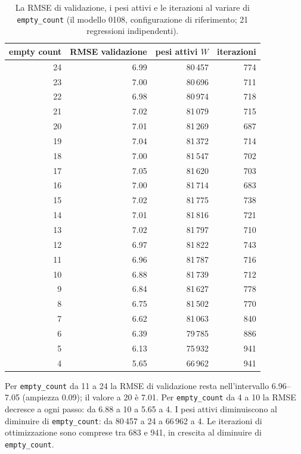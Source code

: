 \begin{table}[ht]
\centering
\begin{tabular}{rrrr}
\toprule
empty count & RMSE validazione & pesi attivi $W$ & iterazioni \\
\midrule
24 & 6.99 & 80\,457 & 774 \\
23 & 7.00 & 80\,696 & 711 \\
22 & 6.98 & 80\,974 & 718 \\
21 & 7.02 & 81\,079 & 715 \\
20 & 7.01 & 81\,269 & 687 \\
19 & 7.04 & 81\,372 & 714 \\
18 & 7.00 & 81\,547 & 702 \\
17 & 7.05 & 81\,620 & 703 \\
16 & 7.00 & 81\,714 & 683 \\
15 & 7.02 & 81\,775 & 738 \\
14 & 7.01 & 81\,816 & 721 \\
13 & 7.02 & 81\,797 & 710 \\
12 & 6.97 & 81\,822 & 743 \\
11 & 6.96 & 81\,787 & 716 \\
10 & 6.88 & 81\,739 & 712 \\
9  & 6.84 & 81\,627 & 778 \\
8  & 6.75 & 81\,502 & 770 \\
7  & 6.62 & 81\,063 & 840 \\
6  & 6.39 & 79\,785 & 886 \\
5  & 6.13 & 75\,932 & 941 \\
4  & 5.65 & 66\,962 & 941 \\
\bottomrule
\end{tabular}
\caption{La RMSE di validazione, i pesi attivi e le iterazioni al
variare di \texttt{empty\_count} (il modello 0108, configurazione di
riferimento; 21 regressioni indipendenti).}
\label{tab:ec-rmse}
\end{table}

Per \texttt{empty\_count} da 11 a 24 la RMSE di validazione resta
nell'intervallo 6.96--7.05 (ampiezza 0.09); il valore a 20 è 7.01.
Per \texttt{empty\_count} da 4 a 10 la RMSE decresce a ogni passo:
da 6.88 a 10 a 5.65 a 4. I pesi attivi diminuiscono al diminuire
di \texttt{empty\_count}: da 80\,457 a 24 a 66\,962 a 4. Le iterazioni di
ottimizzazione sono comprese tra 683 e 941, in crescita al
diminuire di \texttt{empty\_count}.
